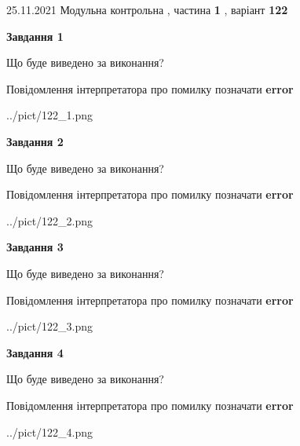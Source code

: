 \documentclass[10pt, ukrainian]{article}
\begin{document}
{25.11.2021 Модульна контрольна , частина \textbf { 1 }, варіант  \No \textbf { 122 }\par}
{
\begin {large}

{\begin {center}\textbf{Завдання 1}\end {center}}\par
Що буде виведено за виконання? \par
Повідомлення інтерпретатора про помилку позначати \textbf{error}

\begin{center}
	{../pict/122_1.png}
\end{center}
\newpage

{\begin {center}\textbf{Завдання 2}\end {center}}\par
Що буде виведено за виконання? \par
Повідомлення інтерпретатора про помилку позначати \textbf{error}

\begin{center}
	{../pict/122_2.png}
\end{center}
\newpage

{\begin {center}\textbf{Завдання 3}\end {center}}\par
Що буде виведено за виконання? \par
Повідомлення інтерпретатора про помилку позначати \textbf{error}

\begin{center}
	{../pict/122_3.png}
\end{center}
\newpage

{\begin {center}\textbf{Завдання 4}\end {center}}\par
Що буде виведено за виконання? \par
Повідомлення інтерпретатора про помилку позначати \textbf{error}

\begin{center}
	{../pict/122_4.png}
\end{center}
\newpage


\end{large}}
\end{document}
